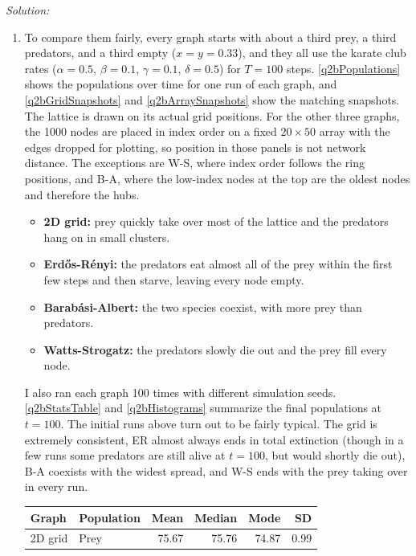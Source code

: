 \documentclass{article}
\newenvironment{solution}
    {\noindent \textit{Solution:}\vspace{1em}\\}
    {\newpage}
\begin{document}
\begin{solution}
\begin{enumerate}
\begin{enumerate}
        \item To compare them fairly, every graph starts with about a third prey, a third predators, and a
        third empty ($x = y = 0.33$), and they all use the karate club rates ($\alpha = 0.5$, $\beta = 0.1$,
        $\gamma = 0.1$, $\delta = 0.5$) for $T = 100$ steps.
        \autoref{q2bPopulations} shows the populations over time for one run of each graph, and
        \autoref{q2bGridSnapshots} and \autoref{q2bArraySnapshots} show the matching snapshots. The lattice is drawn
        on its actual grid positions. For the other three graphs, the 1000 nodes are placed in index order on a fixed
        $20 \times 50$ array with the edges dropped for plotting, so position in those panels is not network
        distance. The exceptions are W-S, where index order follows the ring positions, and B-A, where the low-index nodes at the
        top are the oldest nodes and therefore the hubs.
        \begin{itemize}
            \item \textbf{2D grid:} prey quickly take over most of the lattice and the predators hang on in small
            clusters.
            \item \textbf{Erd\H{o}s-R\'enyi:} the predators eat almost all of the prey within the first few steps
            and then starve, leaving every node empty.
            \item \textbf{Barab\'asi-Albert:} the two species coexist, with more prey than predators.
            \item \textbf{Watts-Strogatz:} the predators slowly die out and the prey fill every node.
        \end{itemize}
        I also ran each graph 100 times with different simulation seeds. \autoref{q2bStatsTable} and \autoref{q2bHistograms} summarize the final populations at $t = 100$.
        The initial runs above turn out to be fairly typical. The grid is extremely consistent, ER almost
        always ends in total extinction (though in a few runs some predators are still alive at $t=100$, but would
        shortly die out), B-A
        coexists with the widest spread, and W-S ends with the prey taking over in every run.
        \begin{table}[ht!]
            \centering
            \begin{tabular}{llrrrr}
                \toprule
                Graph & Population & Mean & Median & Mode & SD \\
                \midrule
                2D grid & Prey & 75.67 & 75.76 & 74.87 & 0.99 \\

\end{tabular}
\end{table}
\end{enumerate}
\end{enumerate}
\end{solution}
\end{document}
